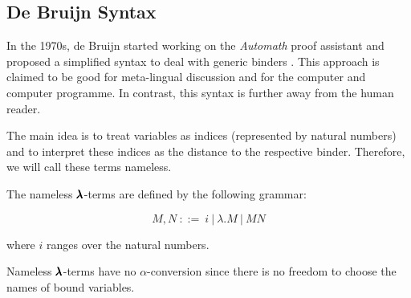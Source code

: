 
\subsection{De Bruijn Syntax}

\cite{deBruijn} \cite{AutosubstSchafer}

In the 1970s, de Bruijn started working on the \textit{Automath} proof assistant and proposed a simplified syntax to deal with generic binders \cite{deBruijn}.
This approach is claimed to be good for meta-lingual discussion and for the computer and computer programme. In contrast, this syntax is further away from the human reader.

The main idea is to treat variables as indices (represented by natural numbers) and to interpret these indices as the distance to the respective binder.
Therefore, we will call these terms nameless. 

\begin{definition}
  The nameless $\pmb{\lambda}$-terms are defined by the following grammar:

  \[ M, N \ ::= \ i \ | \ \lambda . M \ | \ M N \]

  where $i$ ranges over the natural numbers.
\end{definition}

\begin{remark}
  Nameless $\pmb{\lambda}$-terms have no $\alpha$-conversion since there is no freedom to choose the names of bound variables.
\end{remark}


